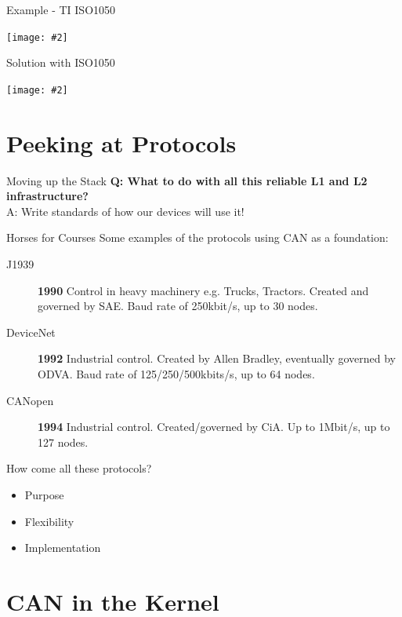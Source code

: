\documentclass{beamer}
\newcommand {\framedgraphic}[2] {
    \begin{frame}{#1}
        \begin{center}
            \texttt{[image: \#2]}
        \end{center}
    \end{frame}
}
\begin{document}
     \framedgraphic{Example - TI ISO1050}{./images/ISO1050_blockdiagram}
     
     \framedgraphic{Solution with ISO1050}{./images/ISO1050_soln}

     
     \section{Peeking at Protocols}
     \begin{frame}{Moving up the Stack}
       \huge
       \textbf{Q: What to do with all this reliable L1 and L2 infrastructure?}\\\pause
       A: Write standards of how our devices will use it!
     \end{frame}

     \begin{frame}{Horses for Courses}
       Some examples of the protocols using CAN as a foundation:
       \begin{description}
       \item[J1939] \textbf{1990} Control in heavy machinery e.g. Trucks,  Tractors. Created and governed by SAE. Baud rate of 250kbit/s, up to 30 nodes.
         \pause
       \item[DeviceNet] \textbf{1992} Industrial control. Created by Allen Bradley, eventually governed by ODVA. Baud rate of 125/250/500kbits/s, up to 64 nodes.
         \pause
         \item[CANopen] \textbf{1994} Industrial control. Created/governed by CiA. Up to 1Mbit/s, up to 127 nodes.
       \end{description}
     \end{frame}

     \begin{frame}
       How come all these protocols?\pause
       \begin{itemize}
       \item{Purpose}\pause
       \item{Flexibility}\pause
       \item{Implementation}
       \end{itemize}
     \end{frame}


     
     \section{CAN in the Kernel}
\end{document}
